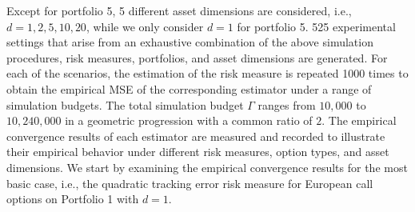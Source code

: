 Except for portfolio 5, 5 different asset dimensions are considered, i.e., $d = 1, 2, 5, 10, 20$, while we only consider $d=1$ for portfolio 5. 
525 experimental settings that arise from an exhaustive combination of the above simulation procedures, risk measures, portfolios, and asset dimensions are generated.
For each of the scenarios, the estimation of the risk measure is repeated 1000 times to obtain the empirical MSE of the corresponding estimator under a range of simulation budgets.
The total simulation budget $\Gamma$ ranges from $10,000$ to $10,240,000$ in a geometric progression with a common ratio of $2$.
The empirical convergence results of each estimator are measured and recorded to illustrate their empirical behavior under different risk measures, option types, and asset dimensions.
We start by examining the empirical convergence results for the most basic case, i.e., the quadratic tracking error risk measure for European call options on Portfolio 1 with $d = 1$.

